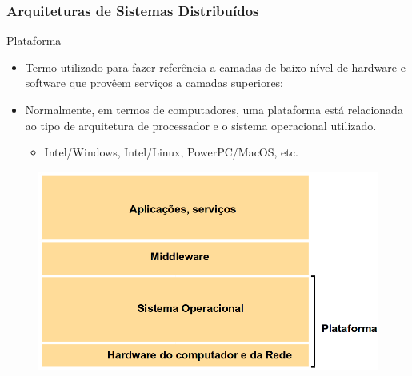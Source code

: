 \documentclass[hyperref={pdfpagelabels=false},table]{beamer}
\begin{document}
\begin{frame}[t]
	\frametitle{Arquiteturas de Sistemas Distribuídos}
	\begin{block}{Plataforma}
		\begin{itemize}
		 	\item Termo utilizado para fazer referência a camadas de baixo nível de hardware e software que provêem serviços a camadas superiores;
			\item Normalmente, em termos de computadores, uma plataforma está relacionada ao tipo de arquitetura de processador e o sistema operacional utilizado.   
			\begin{itemize}
				\item Intel/Windows, Intel/Linux, PowerPC/MacOS, etc.
			\end{itemize}
		\end{itemize}
	\end{block}
	\begin{figure}
		\includegraphics[scale=.2]{figs/middleware}
	\end{figure}
\end{frame}
\end{document}
